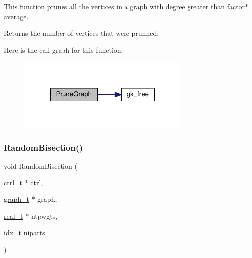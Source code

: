 This function prunes all the vertices in a graph with degree greater than factor$\ast$average.

\begin{DoxyReturn}{Returns}
the number of vertices that were prunned. 
\end{DoxyReturn}
Here is the call graph for this function\+:\nopagebreak
\begin{figure}[H]
\begin{center}
\leavevmode
\includegraphics[width=238pt]{a00945_afc11099daf13e5e24f17076daf471765_cgraph}
\end{center}
\end{figure}
\mbox{\label{a00945_ad9f0573a18d3fcfa45d73c3bef80e5f8}} 
\subsubsection{\texorpdfstring{Random\+Bisection()}{RandomBisection()}}
{\footnotesize\ttfamily void Random\+Bisection (\begin{DoxyParamCaption}\item[{\hyperlink{a00742}{ctrl\+\_\+t} $\ast$}]{ctrl,  }\item[{\hyperlink{a00734}{graph\+\_\+t} $\ast$}]{graph,  }\item[{\hyperlink{a00876_a1924a4f6907cc3833213aba1f07fcbe9}{real\+\_\+t} $\ast$}]{ntpwgts,  }\item[{\hyperlink{a00876_aaa5262be3e700770163401acb0150f52}{idx\+\_\+t}}]{niparts }\end{DoxyParamCaption})}

